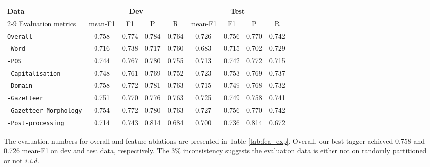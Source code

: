 \documentclass[11pt]{article}
\newcommand{\feature}[1]{\texttt{#1}\xspace}
\newcommand{\tabref}[2][]{Table#1 \ref{#2}}
\begin{document}
\begin{table*}[!htbp]
\begin{center}
\begin{tabular}{lcccccccc}
\toprule
Data                                         & \multicolumn{4}{c}{Dev}             & \multicolumn{4}{c}{Test}        \\
\cmidrule{2-9}
Evaluation metrics                           & mean-F1 & F1    & P     & R         & mean-F1 & F1    & P     & R     \\ 
\midrule
\feature{Overall}                            & 0.758   & 0.774 & 0.784 & 0.764     & 0.726   & 0.756 & 0.770 & 0.742 \\
\hline
\feature{-Word}                              & 0.716   & 0.738 & 0.717 & 0.760     & 0.683   & 0.715 & 0.702 & 0.729 \\
\feature{-POS}                               & 0.744   & 0.767 & 0.780 & 0.755     & 0.713   & 0.742 & 0.772 & 0.715 \\
\feature{-Capitalisation}                    & 0.748   & 0.761 & 0.769 & 0.752     & 0.723   & 0.753 & 0.769 & 0.737 \\
\feature{-Domain}                            & 0.758   & 0.772 & 0.781 & 0.763     & 0.715   & 0.749 & 0.768 & 0.732 \\
\feature{-Gazetteer}                         & 0.751   & 0.770 & 0.776 & 0.763     & 0.725   & 0.749 & 0.758 & 0.741 \\
\feature{-Gazetteer Morphology}              & 0.754   & 0.772 & 0.780 & 0.763     & 0.727   & 0.756 & 0.770 & 0.742 \\
\feature{-Post-processing}                   & 0.714   & 0.743 & 0.814 & 0.684     & 0.700   & 0.736 & 0.814 & 0.672 \\
\bottomrule
\end{tabular}
\end{center}
\caption{Overall experiment results and feature ablations}
\label{tab:fea_exp}
\end{table*}

The evaluation numbers for overall and feature ablations are presented in \tabref{tab:fea_exp}.
Overall, our best tagger achieved 0.758 and 0.726 mean-F1 on dev and test data, respectively.
The 3\% inconsistency suggests the evaluation data is either not on randomly partitioned or not \textit{i.i.d.}
\end{document}
